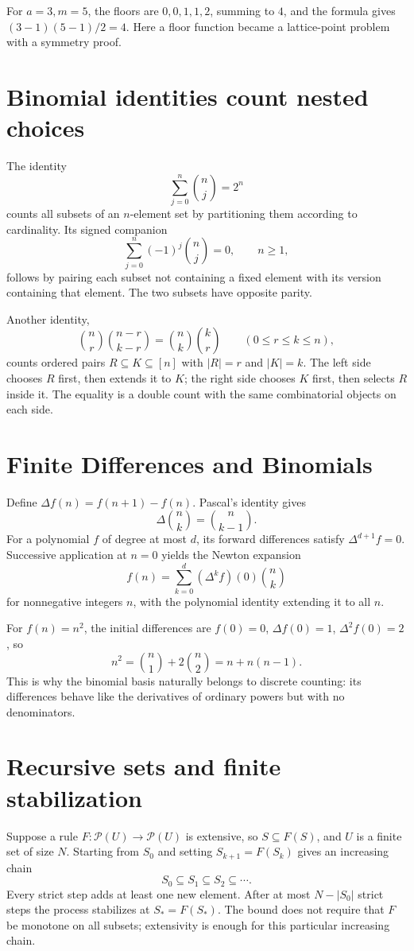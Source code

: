 For \(a=3,m=5\), the floors are \(0,0,1,1,2\), summing to \(4\), and the formula gives \((3-1)(5-1)/2=4\). Here a floor function became a lattice-point problem with a symmetry proof.

\section{Binomial identities count nested choices}

The identity
\[
 \sum_{j=0}^n\binom nj=2^n
\]
counts all subsets of an \(n\)-element set by partitioning them according to cardinality. Its signed companion
\[
 \sum_{j=0}^n(-1)^j\binom nj=0,\qquad n\ge1,
\]
follows by pairing each subset not containing a fixed element with its version containing that element. The two subsets have opposite parity.

Another identity,
\[
 \binom nr\binom{n-r}{k-r}
 =\binom nk\binom kr\qquad(0\le r\le k\le n),
\]
counts ordered pairs \(R\subseteq K\subseteq[n]\) with \(|R|=r\) and \(|K|=k\). The left side chooses \(R\) first, then extends it to \(K\); the right side chooses \(K\) first, then selects \(R\) inside it. The equality is a double count with the same combinatorial objects on each side.

\section{Finite Differences and Binomials}

Define \(\Delta f(n)=f(n+1)-f(n)\). Pascal's identity gives
\[
 \Delta\binom nk=\binom n{k-1}.
\]
For a polynomial \(f\) of degree at most \(d\), its forward differences satisfy \(\Delta^{d+1}f=0\). Successive application at \(n=0\) yields the Newton expansion
\[
 \boxed{f(n)=\sum_{k=0}^d(\Delta^kf)(0)\binom nk}
\]
for nonnegative integers \(n\), with the polynomial identity extending it to all \(n\).

For \(f(n)=n^2\), the initial differences are \(f(0)=0\), \(\Delta f(0)=1\), \(\Delta^2 f(0)=2\), so
\[
 n^2=\binom n1+2\binom n2=n+n(n-1).
\]
This is why the binomial basis naturally belongs to discrete counting: its differences behave like the derivatives of ordinary powers but with no denominators.

\section{Recursive sets and finite stabilization}

Suppose a rule \(F:\mathcal P(U)\to\mathcal P(U)\) is extensive, so \(S\subseteq F(S)\), and \(U\) is a finite set of size \(N\). Starting from \(S_0\) and setting \(S_{k+1}=F(S_k)\) gives an increasing chain
\[
 S_0\subseteq S_1\subseteq S_2\subseteq\cdots.
\]
Every strict step adds at least one new element. After at most \(N-|S_0|\) strict steps the process stabilizes at \(S_*=F(S_*)\). The bound does not require that \(F\) be monotone on all subsets; extensivity is enough for this particular increasing chain.

